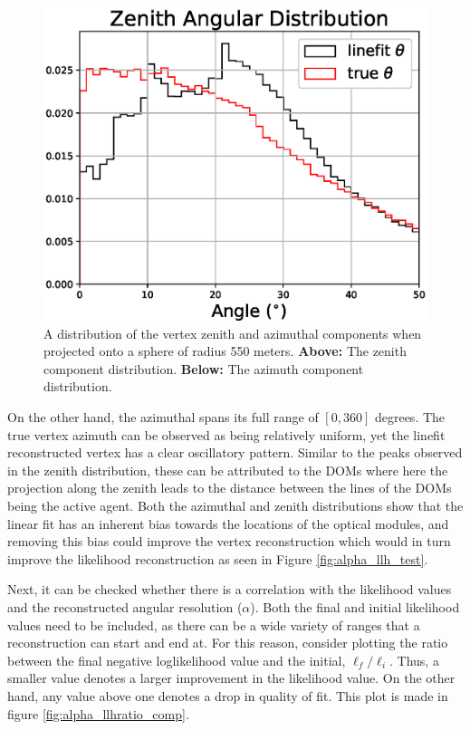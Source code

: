 \begin{figure}[H]
  \centering
  \includegraphics[width=12cm]{./Figures/reco_plots/zenith_vert_dist_modified_zoomed.eps}
  \caption{A distribution of the vertex zenith and azimuthal components when projected onto a sphere of radius 550 meters. \textbf{Above:} The zenith component distribution. \textbf{Below:} The azimuth component distribution.}
  \label{fig:vert_dist_zoomed}
\end{figure}

On the other hand, the azimuthal spans its full range of $[0, 360]$ degrees. The true vertex azimuth can be observed as being relatively uniform, yet the linefit reconstructed vertex has a clear oscillatory pattern. Similar to the peaks observed in the zenith distribution, these can be attributed to the DOMs where here the projection along the zenith leads to the distance between the lines of the DOMs being the active agent. Both the azimuthal and zenith distributions show that the linear fit has an inherent bias towards the locations of the optical modules, and removing this bias could improve the vertex reconstruction which would in turn improve the likelihood reconstruction as seen in Figure \ref{fig:alpha_llh_test}. 

Next, it can be checked whether there is a correlation with the likelihood values and the reconstructed angular resolution ($\alpha$). Both the final and initial likelihood values need to be included, as there can be a wide variety of ranges that a reconstruction can start and end at. For this reason, consider plotting the ratio between the final negative loglikelihood value and the initial, $\ell_{f}/\ell_{i}$. Thus, a smaller value denotes a larger improvement in the likelihood value. On the other hand, any value above one denotes a drop in quality of fit. This plot is made in figure \ref{fig:alpha_llhratio_comp}.

